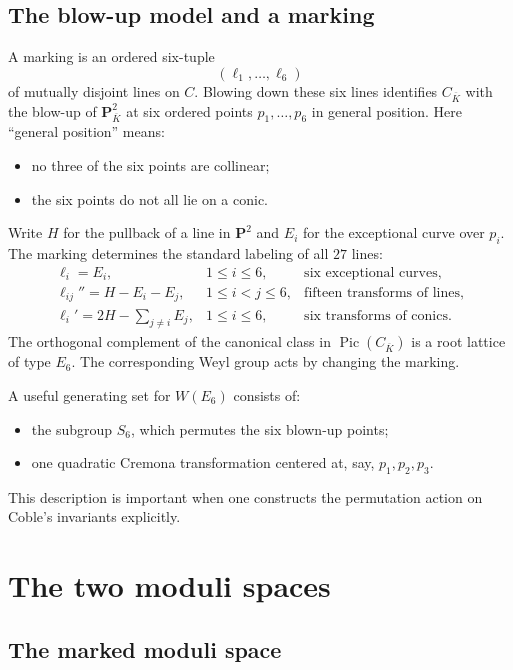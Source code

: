 \documentclass[11pt]{article}
\newcommand{\PP}{\mathbf{P}}
\newcommand{\ol}[1]{\overline{#1}}
\newcommand{\Pic}{\operatorname{Pic}}
\begin{document}
\subsection{The blow-up model and a marking}

A marking is an ordered six-tuple
\[
  (\ell_1,\ldots,\ell_6)
\]
of mutually disjoint lines on $C$.  Blowing down these six lines identifies
$C_{\ol K}$ with the blow-up of $\PP^2_{\ol K}$ at six ordered points
$p_1,\ldots,p_6$ in general position.  Here ``general position'' means:

\begin{itemize}
\item no three of the six points are collinear;
\item the six points do not all lie on a conic.
\end{itemize}

Write $H$ for the pullback of a line in $\PP^2$ and $E_i$ for the exceptional
curve over $p_i$.  The marking determines the standard labeling of all
$27$ lines:
\[
\begin{array}{lll}
 \ell_i=E_i, & 1\leq i\leq 6, & \text{six exceptional curves},\\[2mm]
 \ell_{ij}''=H-E_i-E_j, & 1\leq i<j\leq 6, & \text{fifteen transforms of lines},\\[2mm]
 \ell_i'=2H-\displaystyle\sum_{j\neq i}E_j,
 & 1\leq i\leq 6, & \text{six transforms of conics}.
\end{array}
\]
The orthogonal complement of the canonical class in $\Pic(C_{\ol K})$ is a
root lattice of type $E_6$.  The corresponding Weyl group acts by changing
the marking.

A useful generating set for $W(E_6)$ consists of:

\begin{itemize}
\item the subgroup $S_6$, which permutes the six blown-up points;
\item one quadratic Cremona transformation centered at, say,
$p_1,p_2,p_3$.
\end{itemize}

This description is important when one constructs the permutation action on
Coble's invariants explicitly.

\section{The two moduli spaces}

\subsection{The marked moduli space}
\end{document}
